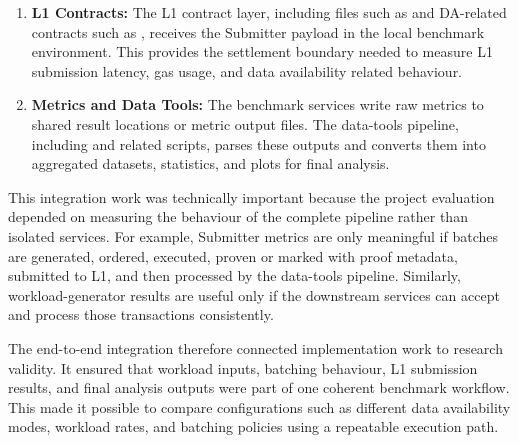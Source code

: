 \begin{enumerate}
    \item \textbf{L1 Contracts:} The L1 contract layer, including files such as  and DA-related contracts such as , receives the Submitter payload in the local benchmark environment. This provides the settlement boundary needed to measure L1 submission latency, gas usage, and data availability related behaviour.

    \item \textbf{Metrics and Data Tools:} The benchmark services write raw metrics to shared result locations or metric output files. The data-tools pipeline, including  and related scripts, parses these outputs and converts them into aggregated datasets, statistics, and plots for final analysis.
\end{enumerate}

This integration work was technically important because the project evaluation depended on measuring the behaviour of the complete pipeline rather than isolated services. For example, Submitter metrics are only meaningful if batches are generated, ordered, executed, proven or marked with proof metadata, submitted to L1, and then processed by the data-tools pipeline. Similarly, workload-generator results are useful only if the downstream services can accept and process those transactions consistently.

The end-to-end integration therefore connected implementation work to research validity. It ensured that workload inputs, batching behaviour, L1 submission results, and final analysis outputs were part of one coherent benchmark workflow. This made it possible to compare configurations such as different data availability modes, workload rates, and batching policies using a repeatable execution path.

